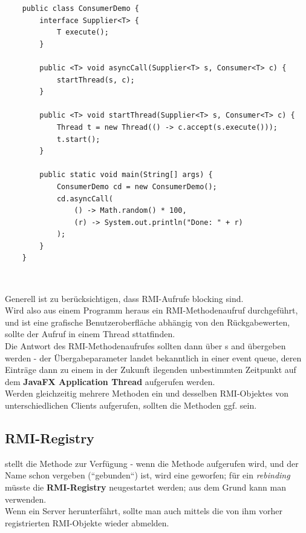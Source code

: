 \begin{verbatim}
    public class ConsumerDemo {
        interface Supplier<T> {
            T execute();
        }

        public <T> void asyncCall(Supplier<T> s, Consumer<T> c) {
            startThread(s, c);
        }

        public <T> void startThread(Supplier<T> s, Consumer<T> c) {
            Thread t = new Thread(() -> c.accept(s.execute()));
            t.start();
        }

        public static void main(String[] args) {
            ConsumerDemo cd = new ConsumerDemo();
            cd.asyncCall(
                () -> Math.random() * 100,
                (r) -> System.out.println("Done: " + r)
            );
        }
    }
\end{verbatim}\\

\begin{tcolorbox}
    Generell ist zu berücksichtigen, dass RMI-Aufrufe blocking sind.\\
    Wird also aus einem Programm heraus ein RMI-Methodenaufruf durchgeführt, und ist eine grafische Benutzeroberfläche abhängig von den Rückgabewerten, sollte der Aufruf in einem Thread sttatfinden.\\
    Die Antwort des RMI-Methodenaufrufes sollten dann über s and  übergeben werden - der Übergabeparameter landet bekanntlich in einer event queue, deren Einträge dann zu einem in der Zukunft ilegenden unbestimmten Zeitpunkt auf dem \textbf{JavaFX Application Thread} aufgerufen werden.\\
    Werden gleichzeitig mehrere Methoden ein und desselben RMI-Objektes von unterschiedlichen Clients aufgerufen, sollten die Methoden ggf.  sein.
\end{tcolorbox}

\subsection{RMI-Registry}

 stellt die Methode  zur Verfügung - wenn die Methode aufgerufen wird, und der Name schon vergeben (``gebunden``) ist, wird eine  geworfen; für ein \textit{rebinding} müsste die \textbf{RMI-Registry} neugestartet werden; aus dem Grund kann man  verwenden.\\
Wenn ein Server herunterfährt, sollte man auch mittels  die von ihm vorher registrierten RMI-Objekte wieder abmelden.

